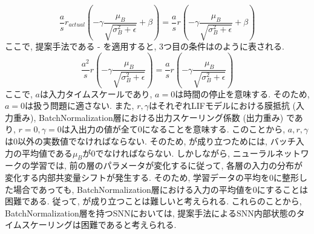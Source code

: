 \begin{equation}
    \frac{a}{s} r_{actual} \left(-\gamma \frac{\mu_B}{\sqrt{\sigma_B^2+\epsilon}} +\beta\right)  = \frac{a}{s} r \left(-\gamma \frac{\mu_B}{\sqrt{\sigma_B^2+\epsilon}} +\beta\right)  
    \label{eq:batchnormalization:lif:approximation:condition3}
\end{equation}
ここで, 提案手法である - を適用すると, 3つ目の条件はのように表される.
\begin{equation}
    \frac{a^2}{s} r \left(-\gamma \frac{\mu_B}{\sqrt{\sigma_B^2+\epsilon}}\right)  = \frac{a}{s} r \left(-\gamma \frac{\mu_B}{\sqrt{\sigma_B^2+\epsilon}}\right)  
    \label{eq:batchnormalization:lif:approximation:condition3:result}
\end{equation}
ここで, $a$は入力タイムスケールであり, $a=0$は時間の停止を意味する.
そのため, $a=0$は扱う問題に適さない.
また, $r, \gamma$はそれぞれLIFモデルにおける膜抵抗 (入力重み), BatchNormalization層における出力スケーリング係数 (出力重み) であり, $r=0, \gamma=0$は入出力の値が全て0になることを意味する.
このことから, $a, r, \gamma$は0以外の実数値でなければならない.
そのため, が成り立つためには, バッチ入力の平均値である$\mu_B$が0でなければならない.
しかしながら, ニューラルネットワークの学習では, 前の層のパラメータが変化するに従って, 各層の入力の分布が変化する内部共変量シフトが発生する\cite{batchnorm}.
そのため, 学習データの平均を0に整形した場合であっても, BatchNormalization層における入力の平均値を0にすることは困難である.
従って, が成り立つことは難しいと考えられる.
これらのことから, BatchNormalization層を持つSNNにおいては, 提案手法によるSNN内部状態のタイムスケーリングは困難であると考えられる.
